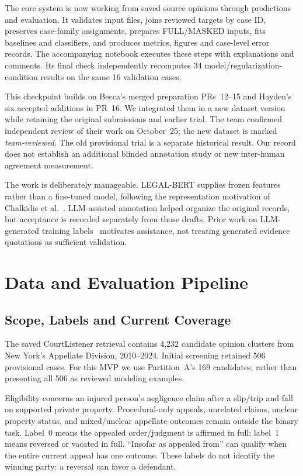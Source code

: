 \documentclass[conference]{IEEEtran}
\begin{document}
The core system is now working from saved source opinions through predictions and evaluation. It validates input files, joins reviewed targets by case ID, preserves case-family assignments, prepares FULL/MASKED inputs, fits baselines and classifiers, and produces metrics, figures and case-level error records. The accompanying notebook executes these steps with explanations and comments. Its final check independently recomputes 34 model/regularization-condition results on the same 16 validation cases.

This checkpoint builds on Becca's merged preparation PRs~12--15 and Hayden's six accepted additions in PR~16. We integrated them in a new dataset version while retaining the original submissions and earlier trial. The team confirmed independent review of their work on October~25; the new dataset is marked \emph{team-reviewed}. The old provisional trial is a separate historical result. Our record does not establish an additional blinded annotation study or new inter-human agreement measurement.

The work is deliberately manageable. LEGAL-BERT supplies frozen features rather than a fine-tuned model, following the representation motivation of Chalkidis et al.~\cite{legalbert}. LLM-assisted annotation helped organize the original records, but acceptance is recorded separately from those drafts. Prior work on LLM-generated training labels~\cite{llmlabels} motivates assistance, not treating generated evidence quotations as sufficient validation.

\section{Data and Evaluation Pipeline}
\subsection{Scope, Labels and Current Coverage}
The saved CourtListener retrieval contains 4,232 candidate opinion clusters from New York's Appellate Division, 2010--2024. Initial screening retained 506 provisional cases. For this MVP we use Partition~A's 169 candidates, rather than presenting all 506 as reviewed modeling examples.

Eligibility concerns an injured person's negligence claim after a slip/trip and fall on supported private property. Procedural-only appeals, unrelated claims, unclear property status, and mixed/unclear appellate outcomes remain outside the binary task. Label~0 means the appealed order/judgment is affirmed in full; label~1 means reversed or vacated in full. ``Insofar as appealed from'' can qualify when the entire current appeal has one outcome. These labels do not identify the winning party: a reversal can favor a defendant.
\end{document}
